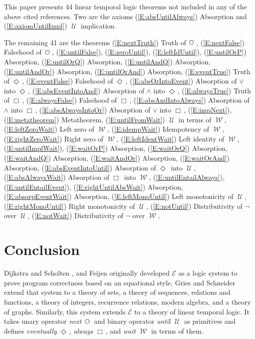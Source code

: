 \documentclass[12pt, fleqn, leqno]{article}
\newcommand{\Until}{\;\mathcal{U}\;}
\newcommand{\Wait}{\;\mathcal{W}\;}
\newcommand{\Next}{\;\,\text{\raisebox{3.5pt}{\circle{6}}}}
\newcommand{\Event}{\Diamond\,}
\newcommand{\Always}{\Box\,}
\begin{document}
This paper presents 44 linear temporal logic theorems not included in any of the above cited references.
Two are the axioms
(\ref{E:absUntilAlways}) Absorption and
(\ref{E:axiomUntilImpl}) $\Until$ implication.

The remaining 41 are the theorems
(\ref{E:nextTruth}) Truth of $\Next$,
(\ref{E:nextFalse}) Falsehood of $\Next$,
(\ref{E:untilFalse}),
(\ref{E:zeroUntil}),
(\ref{E:leftIdUntil}),
(\ref{E:untilOrP}) Absorption,
(\ref{E:untilOrQ}) Absorption,
(\ref{E:untilAndQ}) Absorption,
(\ref{E:untilAndOr}) Absorption,
(\ref{E:untilOrAnd}) Absorption,
(\ref{E:eventTrue}) Truth of $\Event$,
(\ref{E:eventFalse}) Falsehood of $\Event$,
(\ref{E:absOrIntoEvent}) Absorption of $\lor$ into $\Event$,
(\ref{E:absEventIntoAnd}) Absorption of $\land$ into $\Event$,
(\ref{E:alwaysTrue}) Truth of $\Always$,
(\ref{E:alwaysFalse}) Falsehood of $\Always$,
(\ref{E:absAndIntoAlways}) Absorption of $\land$ into $\Always$,
(\ref{E:absAlwaysIntoOr}) Absorption of $\lor$ into $\Always$,
(\ref{E:impNext}),
(\ref{E:metatheorem}) Metatheorem,
(\ref{E:untilFromWait}) $\Until$ in terms of $\Wait$,
(\ref{E:leftZeroWait}) Left zero of $\Wait$,
(\ref{E:idempWait}) Idempotency of $\Wait$,
(\ref{E:rightZeroWait}) Right zero of $\Wait$,
(\ref{E:leftIdentWait}) Left identity of $\Wait$,
(\ref{E:untilImplWait}),
(\ref{E:waitOrP}) Absorption,
(\ref{E:waitOrQ}) Absorption,
(\ref{E:waitAndQ}) Absorption,
(\ref{E:waitAndOr}) Absorption,
(\ref{E:waitOrAnd}) Absorption,
(\ref{E:absEventIntoUntil}) Absorption of $\Event$ into $\Until$,
(\ref{E:absAlwaysWait}) Absorption of $\Always$ into $\Wait$,
(\ref{E:untilEntailAlways}),
(\ref{E:untilEntailEvent}),
(\ref{E:rightUntilAbsWait}) Absorption,
(\ref{E:absorpEventWait}) Absorption,
(\ref{E:leftMonoUntil}) Left monotonicity of $\Until$,
(\ref{E:rightMonoUntil}) Right monotonicity of $\Until$,
(\ref{E:notUntil}) Distributivity of $\neg$ over $\Until$,
(\ref{E:notWait}) Distributivity of $\neg$ over $\Wait$.

\section{Conclusion}

Dijkstra and Scholten \cite{DandS}, and Feijen \cite{Feij} originally developed $\mathcal{E}$ as a logic system to prove
program correctness based on an equational style.
Gries and Schneider extend that system to a theory of sets, a theory of sequences,
relations and functions, a theory of integers, recurrence relations, modern algebra, and a theory of graphs.
Similarly, this system extends $\mathcal{E}$ to a theory of linear temporal logic.
It takes unary operator \textit{next} $\Next$ and binary operator \textit{until} $\Until$ as primitives and defines
\textit{eventually} $\Event$, \textit{always} $\Always$, and \textit{wait} $\Wait$ in terms of them.
\end{document}
